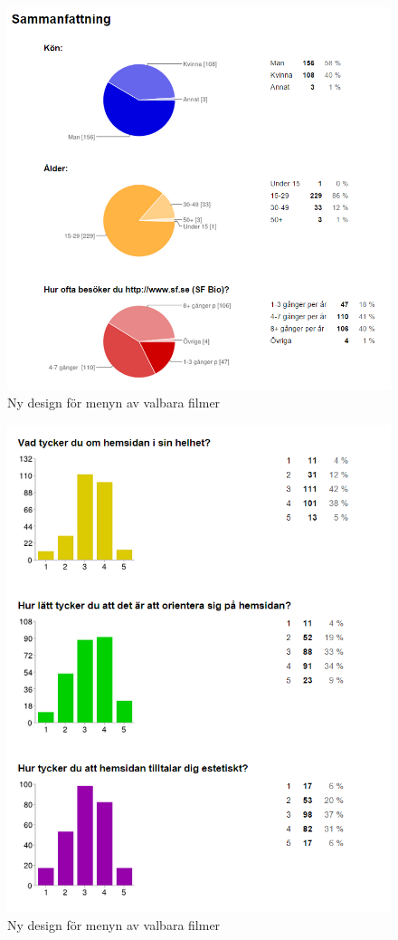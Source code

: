 \documentclass[swedish,a4paper,11pt]{article}
\begin{document}
\begin{figure}[H]
\centering
\includegraphics[scale=0.8]{shart1.PNG} 
\caption{Ny design för menyn av valbara filmer}
\end{figure}

\begin{figure}[H]
\centering
\includegraphics[scale=0.8]{shart2.PNG} 
\caption{Ny design för menyn av valbara filmer}
\end{figure}
\end{document}
